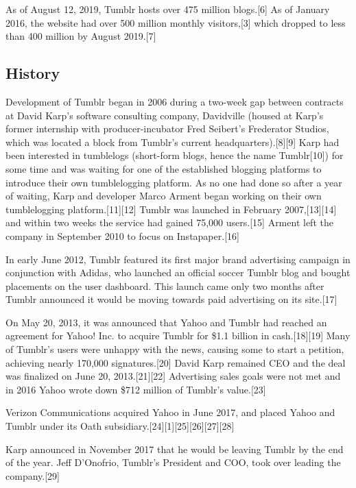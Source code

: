 \documentclass[12pt]{article}
\begin{document}
As of August 12, 2019, Tumblr hosts over 475 million blogs.[6] As of January 2016, the website had over 500 million monthly visitors,[3] which dropped to less than 400 million by August 2019.[7] 





\subsection{History}




Development of Tumblr began in 2006 during a two-week gap between contracts at David Karp's software consulting company, Davidville (housed at Karp's former internship with producer-incubator Fred Seibert's Frederator Studios, which was located a block from Tumblr's current headquarters).[8][9] Karp had been interested in tumblelogs (short-form blogs, hence the name Tumblr[10]) for some time and was waiting for one of the established blogging platforms to introduce their own tumblelogging platform. As no one had done so after a year of waiting, Karp and developer Marco Arment began working on their own tumblelogging platform.[11][12] Tumblr was launched in February 2007,[13][14] and within two weeks the service had gained 75,000 users.[15] Arment left the company in September 2010 to focus on Instapaper.[16]

In early June 2012, Tumblr featured its first major brand advertising campaign in conjunction with Adidas, who launched an official soccer Tumblr blog and bought placements on the user dashboard. This launch came only two months after Tumblr announced it would be moving towards paid advertising on its site.[17]

On May 20, 2013, it was announced that Yahoo and Tumblr had reached an agreement for Yahoo! Inc. to acquire Tumblr for \$1.1 billion in cash.[18][19] Many of Tumblr's users were unhappy with the news, causing some to start a petition, achieving nearly 170,000 signatures.[20] David Karp remained CEO and the deal was finalized on June 20, 2013.[21][22] Advertising sales goals were not met and in 2016 Yahoo wrote down \$712 million of Tumblr's value.[23]

Verizon Communications acquired Yahoo in June 2017, and placed Yahoo and Tumblr under its Oath subsidiary.[24][1][25][26][27][28]

Karp announced in November 2017 that he would be leaving Tumblr by the end of the year. Jeff D'Onofrio, Tumblr's President and COO, took over leading the company.[29]
\end{document}
